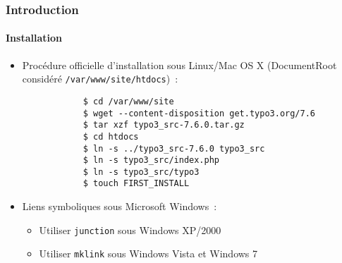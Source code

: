\begin{frame}[fragile]
	\frametitle{Introduction}
	\framesubtitle{Installation}

	\begin{itemize}
		\item Procédure officielle d'installation sous Linux/Mac OS X\newline
			(DocumentRoot considéré \texttt{/var/www/site/htdocs})~:
		\begin{lstlisting}
			$ cd /var/www/site
			$ wget --content-disposition get.typo3.org/7.6
			$ tar xzf typo3_src-7.6.0.tar.gz
			$ cd htdocs
			$ ln -s ../typo3_src-7.6.0 typo3_src
			$ ln -s typo3_src/index.php
			$ ln -s typo3_src/typo3
			$ touch FIRST_INSTALL
		\end{lstlisting}

		\item Liens symboliques sous Microsoft Windows~:

			\begin{itemize}
				\item Utiliser \texttt{junction} sous Windows XP/2000
				\item Utiliser \texttt{mklink} sous Windows Vista et Windows 7
			\end{itemize}

	\end{itemize}
\end{frame}

